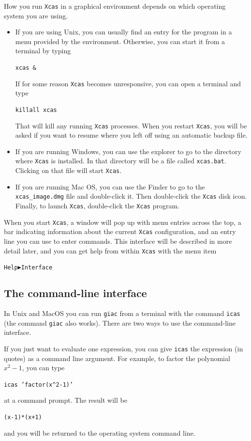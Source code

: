 \documentclass[a4paper,11pt]{book}
\begin{document}
How you run \texttt{Xcas} in a graphical environment depends on which
operating system you are using.
\begin{itemize}
  \item
If you are using Unix, you can usually find
an entry for the program in a menu provided by the environment.
Otherwise, you can start it from a terminal by typing
\begin{center}
  {\tt xcas \&}
\end{center}
If for some reason \texttt{Xcas} becomes unresponsive, you can open a
terminal and type
\begin{center}
  {\tt killall xcas}
\end{center}
That will kill any running \texttt{Xcas} processes.  When you restart
\texttt{Xcas}, you will be asked if you want to resume where you left
off using an automatic backup file.
\item
If you are running Windows, you can use the explorer to go to the
directory where \texttt{Xcas} is installed.  In that directory will be
a file called \texttt{xcas.bat}.  Clicking on that file will start
\texttt{Xcas}.
\item
If you are running Mac OS, you can use the Finder to go to the
\texttt{xcas\_image.dmg} file and double-click it.  Then double-click
the \texttt{Xcas} disk icon.  Finally, to launch \texttt{Xcas},
double-click the \texttt{Xcas} program.
\end{itemize}
When you start \texttt{Xcas}, a
window will pop up with menu entries across the top, a bar
indicating information about the current \texttt{Xcas} configuration,
and an entry line you can use to enter commands.  This interface will
be described in more detail later, and you can get help
from within \texttt{Xcas} with the menu item
\begin{center}
\texttt{Help$\blacktriangleright$Interface}
\end{center}

\subsection{The command-line interface}

In Unix and MacOS you can run \texttt{giac} from a terminal with
the command \texttt{icas} (the command \texttt{giac} also works).
There are two ways to use the command-line interface.

If you just want to evaluate one expression, you can give
\texttt{icas} the expression (in quotes) as a command line argument.
For example, to factor the polynomial $x^2-1$, you can type
\begin{center}
  {\tt icas 'factor(x\^{}2-1)'}
\end{center}
at a command prompt.  The result will be
\begin{center}
  {\tt (x-1)*(x+1)}
\end{center}
and you will be returned to the operating system command line.
\end{document}
